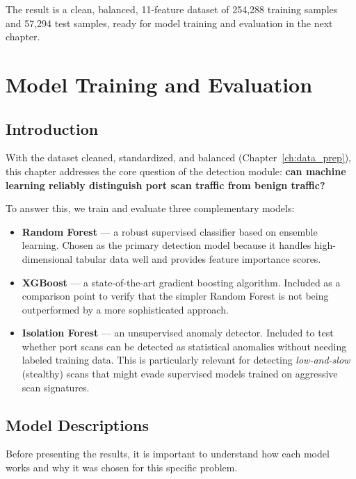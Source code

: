\documentclass[12pt,a4paper]{report}
\begin{document}
The result is a clean, balanced, 11-feature dataset of 254,288 training samples and 57,294 test samples, ready for model training and evaluation in the next chapter.

\chapter{Model Training and Evaluation}\label{ch:model_training}

\section{Introduction}

With the dataset cleaned, standardized, and balanced (Chapter~\ref{ch:data_prep}), this chapter addresses the core question of the detection module: \textbf{can machine learning reliably distinguish port scan traffic from benign traffic?}

To answer this, we train and evaluate three complementary models:

\begin{itemize}
    \item \textbf{Random Forest} --- a robust supervised classifier based on ensemble learning. Chosen as the primary detection model because it handles high-dimensional tabular data well and provides feature importance scores.
    \item \textbf{XGBoost} --- a state-of-the-art gradient boosting algorithm. Included as a comparison point to verify that the simpler Random Forest is not being outperformed by a more sophisticated approach.
    \item \textbf{Isolation Forest} --- an unsupervised anomaly detector. Included to test whether port scans can be detected as statistical anomalies without needing labeled training data. This is particularly relevant for detecting \textit{low-and-slow} (stealthy) scans that might evade supervised models trained on aggressive scan signatures.
\end{itemize}

\section{Model Descriptions}

Before presenting the results, it is important to understand how each model works and why it was chosen for this specific problem.
\end{document}
